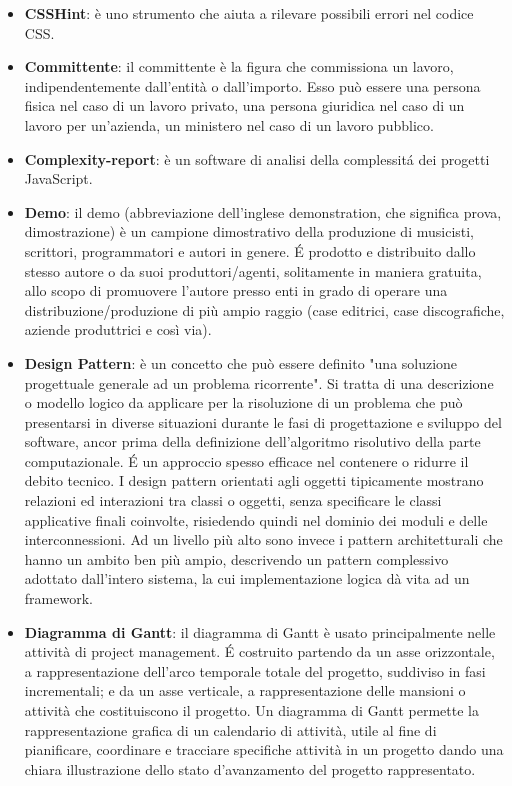 \begin{itemize}
\item[] \textbf{CSSHint}: è uno strumento che aiuta a rilevare possibili errori nel codice CSS.
\item[] \textbf{Committente}: il committente è la figura che commissiona un lavoro, indipendentemente dall'entità o dall'importo. Esso può essere una persona fisica nel caso di un lavoro privato, una persona giuridica nel caso di un lavoro per un'azienda, un ministero nel caso di un lavoro pubblico.
\item[] \textbf{Complexity-report}: è un software di analisi della complessit\'a dei progetti JavaScript.
\end{itemize}
\newpage

\begin{itemize}
\item[] \textbf{Demo}: il demo (abbreviazione dell'inglese demonstration, che significa prova, dimostrazione) è un campione dimostrativo della produzione di musicisti, scrittori, programmatori e autori in genere. \'E prodotto e distribuito dallo stesso autore o da suoi produttori/agenti, solitamente in maniera gratuita, allo scopo di promuovere l'autore presso enti in grado di operare una distribuzione/produzione di più ampio raggio (case editrici, case discografiche, aziende produttrici e così via).
\item[] \textbf{Design Pattern}: è un concetto che può essere definito "una soluzione progettuale generale ad un problema ricorrente". Si tratta di una descrizione o modello logico da applicare per la risoluzione di un problema che può presentarsi in diverse situazioni durante le fasi di progettazione e sviluppo del software, ancor prima della definizione dell'algoritmo risolutivo della parte computazionale. \'E un approccio spesso efficace nel contenere o ridurre il debito tecnico. I design pattern orientati agli oggetti tipicamente mostrano relazioni ed interazioni tra classi o oggetti, senza specificare le classi applicative finali coinvolte, risiedendo quindi nel dominio dei moduli e delle interconnessioni. Ad un livello più alto sono invece i pattern architetturali che hanno un ambito ben più ampio, descrivendo un pattern complessivo adottato dall'intero sistema, la cui implementazione logica dà vita ad un framework.
\item[] \textbf{Diagramma di Gantt}: il diagramma di Gantt è usato principalmente nelle attività di project management. É costruito partendo da un asse orizzontale, a rappresentazione  dell'arco temporale totale del progetto, suddiviso in fasi incrementali; e da un asse verticale, a rappresentazione delle mansioni o attività che costituiscono il progetto. Un diagramma di Gantt permette la rappresentazione grafica di un calendario di attività, utile al fine di pianificare, coordinare e tracciare specifiche attività in un progetto dando una chiara illustrazione dello stato d'avanzamento del progetto rappresentato.
\end{itemize}
\newpage


